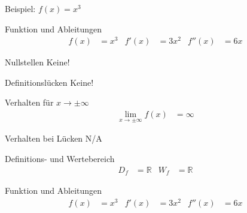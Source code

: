 \begin{*taskframes}{Beispiel: $f(x) = x^3$}

\begin{taskframe}
    \begin{mathbox}{Funktion und Ableitungen}
        \begin{align*}
            f(x) &= x^3 & f'(x) &= 3x^2 & f''(x) &= 6x
        \end{align*}
    \end{mathbox}

    \begin{tcbraster}[raster columns=2, raster equal height]
        \begin{textbox}{Nullstellen}
            Keine!
        \end{textbox}
        \begin{textbox}{Definitionslücken}
            Keine!
        \end{textbox}
        \begin{mathbox}{Verhalten für $x \to \pm \infty$}
            \begin{align*}
                \lim_{x \to \pm \infty} f(x) &= \infty
            \end{align*}
        \end{mathbox}
        \begin{textbox}{Verhalten bei Lücken}
            N/A
        \end{textbox}
    \end{tcbraster}
    \begin{mathbox}{Definitions- und Wertebereich}
        \begin{align*}
            D_f &= \mathbb{R} & W_f &= \mathbb{R}
        \end{align*}
    \end{mathbox}
\end{taskframe}

\begin{taskframe}
    \begin{mathbox}{Funktion und Ableitungen}
        \begin{align*}
            f(x) &= x^3 & f'(x) &= 3x^2 & f''(x) &= 6x
        \end{align*}
    \end{mathbox}


\end{taskframe}
\end{*taskframes}
